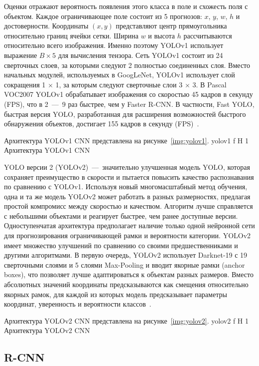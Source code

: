Оценки отражают вероятность появления этого класса в поле и схожесть поля с объектом.
Каждое ограничивающее поле состоит из 5 прогнозов: $x$, $y$, $w$, $h$ и достоверности.
Координаты $(x, y)$ представляют центр прямоугольника относительно границ ячейки сетки.
Ширина $w$ и высота $h$ рассчитываются относительно всего изображения.
Именно поэтому YOLOv1 использует выражение $B \times 5$ для вычисления тензора.
Сеть YOLOv1 состоит из 24 сверточных слоев, за которыми следуют 2 полностью соединенных слоя.
Вместо начальных модулей, используемых в GoogLeNet, YOLOv1 использует слой сокращения 1 $\times$ 1, за которым следуют сверточные слои 3 $\times$ 3.
В Pascal VOC2007 YOLOv1 обрабатывает изображения со скоростью 45 кадров в секунду (FPS), что в 2~---~9 раз быстрее, чем у Faster R-CNN.
В частности, Fast YOLO, быстрая версия YOLO, разработанная для расширения возможностей быстрого обнаружения объектов, достигает 155 кадров в секунду (FPS)~\cite{base, all}.

Архитектура YOLOv1 CNN представлена на рисунке~\ref{img:yolov1}.
	{yolov1}
	{f}
	{H}
	{1\textwidth}
	{Архитектура YOLOv1 CNN}

YOLO версии 2 (YOLOv2)~---~значительно улучшенная модель YOLO, которая сохраняет преимущество в скорости и пытается повысить качество распознавания по сравнению с YOLOv1.
Используя новый многомасштабный метод обучения, одна и та же модель YOLOv2 может работать в разных размерностях, предлагая простой компромисс между скоростью и качеством.
Алгоритм лучше справляется с небольшими объектами и реагирует быстрее, чем ранее доступные версии.
Одноступенчатая архитектура предполагает наличие только одной нейронной сети для прогнозирования ограничивающей рамки и вероятности категории.
YOLOv2 имеет множество улучшений по сравнению со своими предшественниками и другими алгоритмами.
В первую очередь, YOLOv2 использует Darknet-19 с 19 сверточными слоями и 5 слоями Max-Pooling и вводит якорные рамки (anchor boxes), что позволяет лучше адаптироваться к объектам разных размеров.
Вместо абсолютных значений координаты предсказываются как смещения относительно якорных рамок, для каждой из которых модель предсказывает параметры координат, уверенность и вероятности классов~\cite{yolochina, yolobase}.

Архитектура YOLOv2 CNN представлена на рисунке~\ref{img:yolov2}.
	{yolov2}
	{f}
	{H}
	{1\textwidth}
	{Архитектура YOLOv2 CNN}

\subsection{R-CNN}

